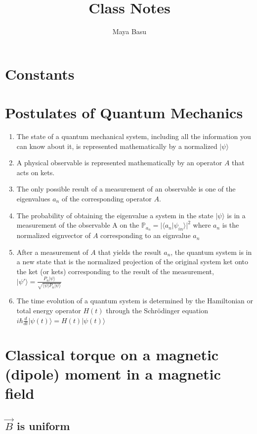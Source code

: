 \documentclass{homework}
\author{Maya Basu}
\title{Class Notes}
\newcommand{\kt}{\rangle}
\newcommand{\br}{\langle}
\begin{document}
 \maketitle
\section{Constants}


\section{Postulates of Quantum Mechanics}
\begin{enumerate}
    \item The state of a quantum mechanical system, including all the information you can know about it, is represented mathematically by a normalized $| \psi \kt$ 
    \item A physical observable is represented mathematically by an operator $A$ that acts on kets.
    \item The only possible result of a measurement of an observable is one of the eigenvalues $a_n$ of the corresponding operator $A$.
    \item The probability of obtaining the eigenvalue a system in the state $| \psi \kt$  is in a measurement of the observable A on the $\mathbb{P}_{a_n} = |\br a_n | \psi_{in} \kt |^2$ where $a_n$ is the normalized eignvector of $A$ corresponding to an eignvalue $a_n$
    \item After a measurement of $A$ that yields the result $a_n$, the quantum system is in a new state that is the normalized projection of the original system ket onto the ket (or kets) corresponding to the result of the measurement, $| \psi' \kt = \frac{P_n | \psi \kt}{\sqrt{ \br \psi | P_n | \psi \kt}}$
    \item The time evolution of a quantum system is determined by the Hamiltonian or total energy operator $H(t)$ through the Schrödinger equation $i\hbar \frac{d}{dt}| \psi (t) \kt = H(t)| \psi (t) \kt$


\end{enumerate}


\section{Classical torque on a magnetic (dipole) moment in a magnetic field}

\subsection{$\vec{B}$ is uniform}
\end{document}
